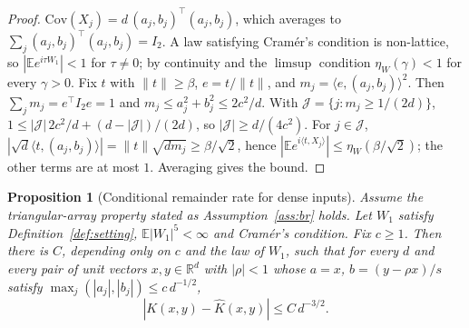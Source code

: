\documentclass[11pt]{article}
\newtheorem{proposition}{Proposition}
\theoremstyle{definition}
\newcommand{\E}{\mathbb{E}}
\newcommand{\R}{\mathbb{R}}
\begin{document}
\begin{proof}
$\mathrm{Cov}(X_j)=d\,(a_j,b_j)^\top(a_j,b_j)$, which averages to $\sum_j(a_j,b_j)^\top(a_j,b_j)=I_2$.
A law satisfying Cramér's condition is non-lattice, so $|\E e^{i\tau W_1}|<1$ for
$\tau\neq0$; by continuity and the $\limsup$ condition $\eta_W(\gamma)<1$ for every
$\gamma>0$. Fix $t$ with $\|t\|\ge\beta$, $e=t/\|t\|$, and
$m_j=\langle e,(a_j,b_j)\rangle^2$. Then $\sum_jm_j=e^\top I_2e=1$ and
$m_j\le a_j^2+b_j^2\le2c^2/d$. With $\mathcal J=\{j:m_j\ge1/(2d)\}$,
$1\le|\mathcal J|\,2c^2/d+(d-|\mathcal J|)/(2d)$, so $|\mathcal J|\ge d/(4c^2)$. For
$j\in\mathcal J$, $|\sqrt d\langle t,(a_j,b_j)\rangle|=\|t\|\sqrt{dm_j}\ge\beta/\sqrt2$, hence
$|\E e^{i\langle t,X_j\rangle}|\le\eta_W(\beta/\sqrt2)$; the other terms are at most $1$.
Averaging gives the bound.
\end{proof}

\begin{proposition}[Conditional remainder rate for dense inputs]\label{thm:remainder}
Assume the triangular-array property stated as Assumption~\ref{ass:br} holds. Let
$W_1$ satisfy Definition~\ref{def:setting}, $\E|W_1|^5<\infty$ and Cramér's
condition. Fix $c\ge1$. Then there is $C$, depending only on $c$ and the law of $W_1$,
such that for every $d$ and every pair of unit vectors $x,y\in\R^d$ with $|\rho|<1$ whose
$a=x$, $b=(y-\rho x)/s$ satisfy $\max_j(|a_j|,|b_j|)\le c\,d^{-1/2}$,
\[
|K(x,y)-\widehat K(x,y)|\le C\,d^{-3/2}.
\]
\end{proposition}
\end{document}
